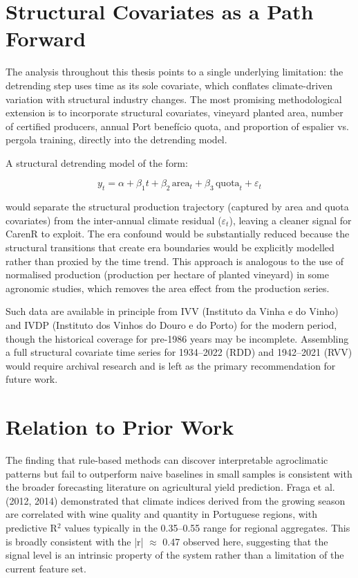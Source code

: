 \section{Structural Covariates as a Path Forward}\label{sec:structural_covariates_as_a}

The analysis throughout this thesis points to a single underlying limitation: the detrending step uses time as its sole covariate, which conflates climate-driven variation with structural industry changes. The most promising methodological extension is to incorporate structural covariates, vineyard planted area, number of certified producers, annual Port benefício quota, and proportion of espalier vs. pergola training, directly into the detrending model.

A structural detrending model of the form:

\begin{equation}
  y_t = \alpha + \beta_1 t + \beta_2 \,\text{area}_t + \beta_3 \,\text{quota}_t + \varepsilon_t
  \label{eq:structural_detrend}
\end{equation}

would separate the structural production trajectory (captured by area and quota covariates) from the inter-annual climate residual ($\varepsilon_t$), leaving a cleaner signal for CarenR to exploit. The era confound would be substantially reduced because the structural transitions that create era boundaries would be explicitly modelled rather than proxied by the time trend. This approach is analogous to the use of normalised production (production per hectare of planted vineyard) in some agronomic studies, which removes the area effect from the production series.

Such data are available in principle from IVV (Instituto da Vinha e do Vinho) and IVDP (Instituto dos Vinhos do Douro e do Porto) for the modern period, though the historical coverage for pre-1986 years may be incomplete. Assembling a full structural covariate time series for 1934--2022 (RDD) and 1942--2021 (RVV) would require archival research and is left as the primary recommendation for future work.


\section{Relation to Prior Work}\label{sec:relation_to_prior_work}

The finding that rule-based methods can discover interpretable agroclimatic patterns but fail to outperform naive baselines in small samples is consistent with the broader forecasting literature on agricultural yield prediction. Fraga et al. (2012, 2014) demonstrated that climate indices derived from the growing season are correlated with wine quality and quantity in Portuguese regions, with predictive R$^2$ values typically in the 0.35--0.55 range for regional aggregates. This is broadly consistent with the |r| $\approx$ 0.47 observed here, suggesting that the signal level is an intrinsic property of the system rather than a limitation of the current feature set.

